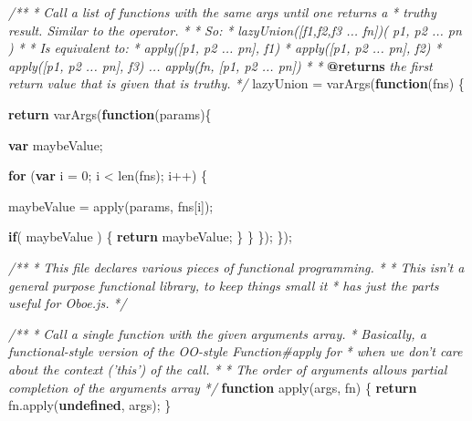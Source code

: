 \documentclass[]{article}
\newenvironment{Shaded}{}{}
\newcommand{\KeywordTok}[1]{\textcolor[rgb]{0.00,0.44,0.13}{\textbf{{#1}}}}
\newcommand{\DecValTok}[1]{\textcolor[rgb]{0.25,0.63,0.44}{{#1}}}
\newcommand{\CommentTok}[1]{\textcolor[rgb]{0.38,0.63,0.69}{\textit{{#1}}}}
\newcommand{\OtherTok}[1]{\textcolor[rgb]{0.00,0.44,0.13}{{#1}}}
\newcommand{\FunctionTok}[1]{\textcolor[rgb]{0.02,0.16,0.49}{{#1}}}
\newcommand{\NormalTok}[1]{{#1}}
\begin{document}
\begin{Shaded}
\begin{Highlighting}[]
\CommentTok{/**}
\CommentTok{ * Call a list of functions with the same args until one returns a }
\CommentTok{ * truthy result. Similar to the \textbar{}\textbar{} operator.}
\CommentTok{ * }
\CommentTok{ * So:}
\CommentTok{ *      lazyUnion([f1,f2,f3 ... fn])( p1, p2 ... pn )}
\CommentTok{ *      }
\CommentTok{ * Is equivalent to: }
\CommentTok{ *      apply([p1, p2 ... pn], f1) \textbar{}\textbar{} }
\CommentTok{ *      apply([p1, p2 ... pn], f2) \textbar{}\textbar{} }
\CommentTok{ *      apply([p1, p2 ... pn], f3) ... apply(fn, [p1, p2 ... pn])  }
\CommentTok{ *  }
\CommentTok{ * }\KeywordTok{@returns}\CommentTok{ the first return value that is given that is truthy.}
\CommentTok{ */}
   \NormalTok{lazyUnion = }\FunctionTok{varArgs}\NormalTok{(}\KeywordTok{function}\NormalTok{(fns) \{}

      \KeywordTok{return} \FunctionTok{varArgs}\NormalTok{(}\KeywordTok{function}\NormalTok{(params)\{}
   
         \KeywordTok{var} \NormalTok{maybeValue;}
   
         \KeywordTok{for} \NormalTok{(}\KeywordTok{var} \NormalTok{i = }\DecValTok{0}\NormalTok{; i < }\FunctionTok{len}\NormalTok{(fns); i++) \{}
   
            \NormalTok{maybeValue = }\FunctionTok{apply}\NormalTok{(params, fns[i]);}
   
            \KeywordTok{if}\NormalTok{( maybeValue ) \{}
               \KeywordTok{return} \NormalTok{maybeValue;}
            \NormalTok{\}}
         \NormalTok{\}}
      \NormalTok{\});}
   \NormalTok{\});   }

\CommentTok{/**}
\CommentTok{ * This file declares various pieces of functional programming.}
\CommentTok{ * }
\CommentTok{ * This isn't a general purpose functional library, to keep things small it}
\CommentTok{ * has just the parts useful for Oboe.js.}
\CommentTok{ */}


\CommentTok{/**}
\CommentTok{ * Call a single function with the given arguments array.}
\CommentTok{ * Basically, a functional-style version of the OO-style Function#apply for }
\CommentTok{ * when we don't care about the context ('this') of the call.}
\CommentTok{ * }
\CommentTok{ * The order of arguments allows partial completion of the arguments array}
\CommentTok{ */}
\KeywordTok{function} \FunctionTok{apply}\NormalTok{(args, fn) \{}
   \KeywordTok{return} \OtherTok{fn}\NormalTok{.}\FunctionTok{apply}\NormalTok{(}\KeywordTok{undefined}\NormalTok{, args);}
\NormalTok{\}}


\end{Highlighting}
\end{Shaded}
\end{document}
